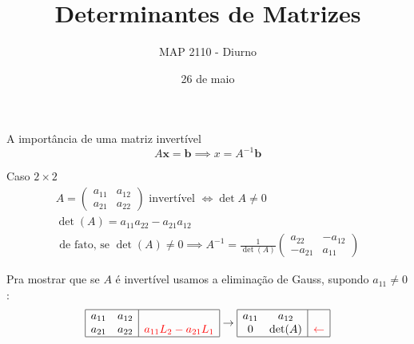 \documentclass{beamer}
\title[Determinantes]{Determinantes de Matrizes}
\author{MAP 2110 - Diurno}
\institute{IME USP}
\date{26 de maio}
\begin{document}
\begin{frame}
  \titlepage
\end{frame}

\begin{frame}{A importância de uma matriz invertível}
  $$ A\mathbf{x} = \mathbf{b} \implies x= A^{-1}\mathbf{b} $$

  \begin{center}
  \end{center}

\end{frame}

\begin{frame}{Caso $2\times 2$}
\begin{gather*}
  A = \begin{pmatrix}
    a_{11} & a_{12} \\ 
    a_{21} & a_{22}
  \end{pmatrix} \text{ invertível } \iff \det{A} \neq 0 \\
  \det(A) = a_{11}a_{22} - a_{21}a_{12} \\
  \text{ de fato, se } \det(A)\neq 0 \implies A^{-1} = \frac{1}{\det(A)}\begin{pmatrix}
    a_{22} & -a_{12} \\ -a_{21} & a_{11}
  \end{pmatrix} 
\end{gather*}
\end{frame}

\begin{frame}{}
  Pra mostrar que se $A$ é invertível usamos a eliminação de Gauss, supondo $a_{11}\neq 0$:
  $$
  \begin{array}{|cc|c|}\hline
    a_{11} & a_{12} & \\ 
    a_{21} & a_{22} & \textcolor{red}{a_{11}L_2 - a_{21}L_1} \\ \hline  
  \end{array}\rightarrow
  \begin{array}{|cc|c|}\hline
    a_{11} & a_{12} & \\ 
    0 & \det(A) & \textcolor{red}{\leftarrow} \\ \hline  
  \end{array}
  $$
 
\end{frame}
\end{document}
